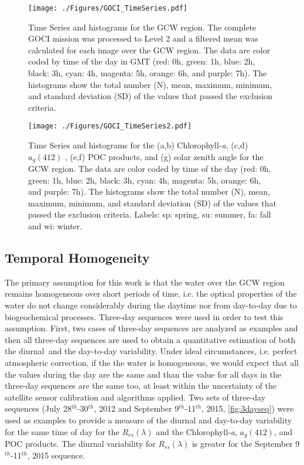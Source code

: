 \documentclass[onecolumn,3p,letterpaper,11pt]{elsarticle}
\begin{document}
\begin{figure}[H]
  \centering
    \texttt{[image: ./Figures/GOCI\_TimeSeries.pdf]}
    \vspace{-0.5cm}
    \caption{Time Series and histograms for the GCW region. The complete GOCI mission was processed to Level 2 and a filtered mean was calculated for each image over the GCW region. The data are color coded by time of the day  in GMT (red: 0h, green: 1h, blue: 2h, black: 3h, cyan: 4h, magenta: 5h, orange: 6h, and purple: 7h). The histograms show the total number (N), mean, maximum, minimum, and standard deviation (SD) of the values that passed the exclusion criteria.\label{fig:GOCI_TimeSeries} } 
\end{figure}
\begin{figure}[H]

  \centering
    \texttt{[image: ./Figures/GOCI\_TimeSeries2.pdf]}
    \caption{Time Series and histograms for the (a,b) Chlorophyll-{\it a}, (c,d) $a_g(412)$ , (e,f) POC products, and (g) solar zenith angle for the GCW region. The data are color coded by time of the day (red: 0h, green: 1h, blue: 2h, black: 3h, cyan: 4h, magenta: 5h, orange: 6h, and purple: 7h). The histograms show the total number (N), mean, maximum, minimum, and standard deviation (SD) of the values that passed the exclusion criteria. Labels: sp: spring, su: summer, fa: fall and wi: winter. \label{fig:GOCI_TimeSeries2} } 
\end{figure}
\subsection{Temporal Homogeneity}
The primary assumption for this work is that the water over the GCW region remains homogeneous over short periods of time, i.e. the optical properties of the water do not change considerably during the daytime nor from day-to-day due to biogeochemical processes. Three-day sequences were used in order to test this assumption. First, two cases of three-day sequences are analyzed as examples and then all three-day sequences are used to obtain a quantitative estimation of both the diurnal~and the day-to-day variability. Under ideal circumstances, i.e. perfect atmospheric correction, if the the water is homogeneous, we would expect that all the values during the day are the same and than the value for all days in the three-day sequences are the same too, at least within the uncertainty of the satellite sensor calibration and algorithms applied. Two sets of three-day sequences (July 28$^{th}$-30$^{th}$, 2012 and September 9$^{th}$-11$^{th}$, 2015, \autoref{fig:3dayseq}) were used as examples to provide a measure of the diurnal and day-to-day variability for the same time of day for the $R_{rs}(\lambda)$ and the Chlorophyll-{\it a}, $a_g(412)$, and POC products. The diurnal variability for $R_{rs}(\lambda)$ is greater for the September 9$^{th}$-11$^{th}$, 2015 sequence. 
\end{document}
